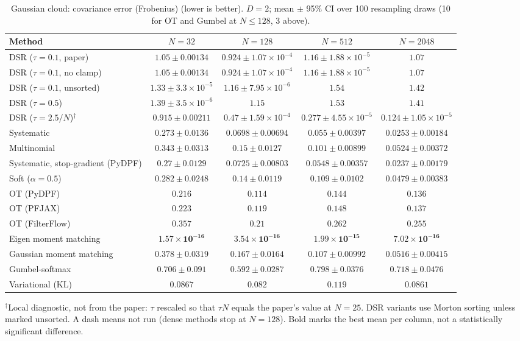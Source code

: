 \begin{table}[H]
\centering
\small
\caption{Gaussian cloud: covariance error (Frobenius) (lower is better). $D{=}2$; mean $\pm$ 95\% CI over 100 resampling draws (10 for OT and Gumbel at $N\le128$, 3 above).}
\label{tab:static-gaussian-covariance_error}
\begin{adjustbox}{max width=\linewidth}
\begin{tabular}{lcccc}
\toprule
Method & $N{=}32$ & $N{=}128$ & $N{=}512$ & $N{=}2048$ \\
\midrule
DSR ($\tau{=}0.1$, paper) & $1.05\pm0.00134$ & $0.924\pm1.07\times10^{-4}$ & $1.16\pm1.88\times10^{-5}$ & $1.07$ \\
DSR ($\tau{=}0.1$, no clamp) & $1.05\pm0.00134$ & $0.924\pm1.07\times10^{-4}$ & $1.16\pm1.88\times10^{-5}$ & $1.07$ \\
DSR ($\tau{=}0.1$, unsorted) & $1.33\pm3.3\times10^{-5}$ & $1.16\pm7.95\times10^{-6}$ & $1.54$ & $1.42$ \\
DSR ($\tau{=}0.5$) & $1.39\pm3.5\times10^{-6}$ & $1.15$ & $1.53$ & $1.41$ \\
DSR ($\tau{=}2.5/N$)$^\dagger$ & $0.915\pm0.00211$ & $0.47\pm1.59\times10^{-4}$ & $0.277\pm4.55\times10^{-5}$ & $0.124\pm1.05\times10^{-5}$ \\
\midrule
Systematic & $0.273\pm0.0136$ & $0.0698\pm0.00694$ & $0.055\pm0.00397$ & $0.0253\pm0.00184$ \\
Multinomial & $0.343\pm0.0313$ & $0.15\pm0.0127$ & $0.101\pm0.00899$ & $0.0524\pm0.00372$ \\
Systematic, stop-gradient (PyDPF) & $0.27\pm0.0129$ & $0.0725\pm0.00803$ & $0.0548\pm0.00357$ & $0.0237\pm0.00179$ \\
Soft ($\alpha{=}0.5$) & $0.282\pm0.0248$ & $0.14\pm0.0119$ & $0.109\pm0.0102$ & $0.0479\pm0.00383$ \\
OT (PyDPF) & $0.216$ & $0.114$ & $0.144$ & $0.136$ \\
OT (PFJAX) & $0.223$ & $0.119$ & $0.148$ & $0.137$ \\
OT (FilterFlow) & $0.357$ & $0.21$ & $0.262$ & $0.255$ \\
Eigen moment matching & $\mathbf{1.57\times10^{-16}}$ & $\mathbf{3.54\times10^{-16}}$ & $\mathbf{1.99\times10^{-15}}$ & $\mathbf{7.02\times10^{-16}}$ \\
Gaussian moment matching & $0.378\pm0.0319$ & $0.167\pm0.0164$ & $0.107\pm0.00992$ & $0.0516\pm0.00415$ \\
Gumbel-softmax & $0.706\pm0.091$ & $0.592\pm0.0287$ & $0.798\pm0.0376$ & $0.718\pm0.0476$ \\
Variational (KL) & $0.0867$ & $0.082$ & $0.119$ & $0.0861$ \\
\bottomrule
\end{tabular}
\end{adjustbox}
\par\smallskip\parbox{0.95\linewidth}{\footnotesize $^\dagger$Local diagnostic, not from the paper: $\tau$ rescaled so that $\tau N$ equals the paper's value at $N{=}25$. DSR variants use Morton sorting unless marked unsorted. A dash means not run (dense methods stop at $N{=}128$). Bold marks the best mean per column, not a statistically significant difference.}
\end{table}

